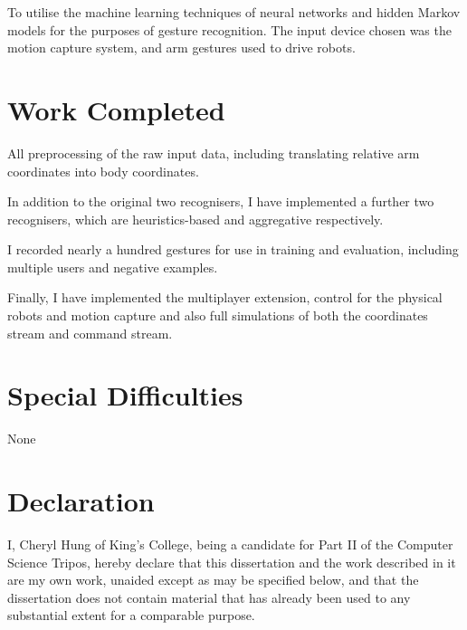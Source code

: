 \documentclass[12pt,a4,notitlepage]{report}
\renewcommand{\_}{\texttt{\symbol{95}}}
\newcommand{\<}{\texttt{\symbol{60}}}
\renewcommand{\>}{\texttt{\symbol{62}}}
\begin{document}
To utilise the machine learning techniques of neural networks and hidden Markov models for the purposes of gesture recognition. The input device chosen was the motion capture system, and arm gestures used to drive robots.

\section*{Work Completed}

All preprocessing of the raw input data, including translating relative arm coordinates into body coordinates.

In addition to the original two recognisers, I have implemented a further two recognisers, which are heuristics-based and aggregative respectively.

I recorded nearly a hundred gestures for use in training and evaluation, including multiple users and negative examples.

Finally, I have implemented the multiplayer extension, control for the physical robots and motion capture and also full simulations of both the coordinates stream and command stream.

\section*{Special Difficulties}

None
 
\newpage
\section*{Declaration}

I, Cheryl Hung of King's College, being a candidate for Part II of the Computer Science Tripos, hereby declare that this dissertation and the work described in it are my own work, unaided except as may be specified below, and that the dissertation does not contain material that has already been used to any substantial extent for a comparable purpose.

\bigskip
{}

\medskip
{}

\cleardoublepage

\tableofcontents

\listoffigures


\cleardoublepage        %
\end{document}
